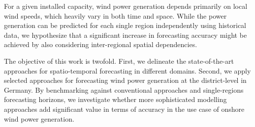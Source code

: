 For a given installed capacity, wind power generation depends primarily on local wind speeds, which heavily vary in both time and space.
While the power generation can be predicted for each single region independently using historical data, we hypothesize that a significant increase in forecasting accuracy might be achieved by also considering inter-regional spatial dependencies. 

The objective of this work is twofold.
First, we delineate the state-of-the-art approaches for spatio-temporal forecasting in different domains.
Second, we apply selected approaches for forecasting wind power generation at the district-level in Germany.
By benchmarking against conventional approaches and single-regions forecasting horizons, we investigate whether more sophisticated modelling approaches add significant value in terms of accuracy in the use case of onshore wind power generation.  